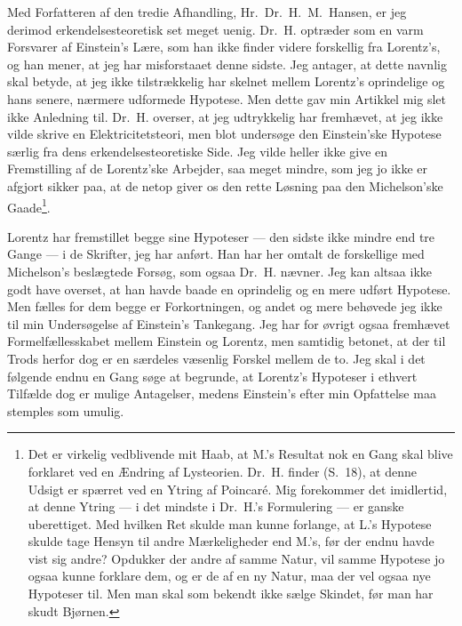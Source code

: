 \documentclass[12pt,a4paper]{article}
\newcommand{\opage}[1]{\marginnote{\footnotesize\textit{[#1]}}}
\begin{document}
\opage{193} Med Forfatteren af den tredie Afhandling, Hr.\ Dr.\ H.\ M.\ Hansen, er jeg
derimod erkendelsesteoretisk set meget uenig. Dr.\ H. optræder som en varm
Forsvarer af Einstein's Lære, som han ikke finder videre forskellig fra
Lorentz's, og han mener, at jeg har misforstaaet denne sidste. Jeg antager, at
dette navnlig skal betyde, at jeg ikke tilstrækkelig har skelnet mellem
Lorentz's oprindelige og hans senere, nærmere udformede Hypotese. Men dette
gav min Artikkel mig slet ikke Anledning til. Dr.\ H. overser, at jeg
udtrykkelig har fremhævet, at jeg ikke vilde skrive en Elektricitetsteori, men
blot undersøge den Einstein'ske Hypotese særlig fra dens erkendelsesteoretiske
Side. Jeg vilde heller ikke give en Fremstilling af de Lorentz'ske Arbejder,
saa meget mindre, som jeg jo ikke er afgjort sikker paa, at de netop giver os
den rette Løsning paa den Michelson'ske Gaade\footnote{Det er virkelig
vedblivende mit Haab, at M.'s Resultat nok en Gang skal blive forklaret ved en
Ændring af Lysteorien. Dr.\ H. finder (S.\ 18), at denne Udsigt er spærret ved
en Ytring af Poincaré. Mig forekommer det imidlertid, at denne Ytring --- i det
mindste i Dr.\ H.'s Formulering --- er ganske uberettiget. Med hvilken Ret
skulde man kunne forlange, at L.'s Hypotese skulde tage Hensyn til andre
Mærkeligheder end M.'s, før der endnu havde vist sig andre? Opdukker der andre
af samme Natur, vil samme Hypotese jo ogsaa kunne forklare dem, og er de af en
ny Natur, maa der vel ogsaa nye Hypoteser til. Men man skal som bekendt ikke
sælge Skindet, før man har skudt Bjørnen.}.

Lorentz har fremstillet begge sine Hypoteser --- den sidste ikke mindre end
tre Gange --- i de Skrifter, jeg har anført. Han har her omtalt de forskellige
med Michelson's beslægtede Forsøg, som ogsaa Dr.\ H. nævner. Jeg kan altsaa
ikke godt have overset, at han havde baade en oprindelig og en mere udført
Hypotese. Men fælles for dem begge er Forkortningen, og andet og mere behøvede
jeg ikke til min Undersøgelse af Einstein's Tankegang. Jeg har for øvrigt ogsaa
fremhævet Formelfællesskabet mellem Einstein og Lorentz, men samtidig betonet,
at der til Trods herfor dog er en særdeles væsenlig Forskel mellem de to. Jeg
skal i det følgende endnu en Gang søge at begrunde, at Lorentz's Hypoteser i
ethvert Tilfælde dog er mulige Antagelser, medens Einstein's efter min
Opfattelse maa stemples som umulig.
\end{document}
